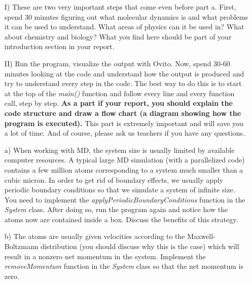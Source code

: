 \documentclass[a4wide,12pt]{article}
\begin{document}
\begin{enumerate}
\item[I)] These are two very important steps that come even before part a. First, spend 30 minutes figuring out what molecular dynamics is and what problems it can be used to understand. What areas of physics can it be used in? What about chemistry and biology? What you find here should be part of your introduction section in your report. 
\item[II)] Run the program, visualize the output with Ovito. Now, spend 30-60 minutes looking at the code and understand how the output is produced and try to understand every step in the code. The best way to do this is to start at the top of the \textit{main()} function and follow every line and every function call, step by step. \textbf{As a part if your report, you should explain the code structure and draw a flow chart (a diagram showing how the program is executed).} This part is extremely important and will save you a lot of time. And of course, please ask us teachers if you have any questions.

\item[a)] 
When working with MD, the system size is usually limited by available computer resources. A typical large MD simulation (with a parallelized code) contains a few million atoms corresponding to a system much smaller than a cubic micron. In order to get rid of boundary effects, we usually apply periodic boundary conditions so that we simulate a system of infinite size. You need to implement the \textit{applyPeriodicBoundaryConditions} function in the \textit{System} class. After doing so, run the program again and notice how the atoms now are contained inside a box. Discuss the benefits of this strategy.

\item[b)] 
The atoms are usually given velocities according to the Maxwell-Boltzmann distribution (you should discuss why this is the case) which will result in a nonzero net momentum in the system. Implement the \textit{removeMomentum} function in the \textit{System} class so that the net momentum is zero.
 

\end{enumerate}
\end{document}

